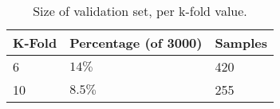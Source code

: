 \begin{table}[H]
    \centering
    \begin{tabularx}{\textwidth}{@{}lll@{}}
    \toprule
    K-Fold & Percentage (of 3000) & Samples \\ \midrule
    6      & \(14\%\)             & 420     \\
    10     & \(8.5\%\)            & 255     \\ \bottomrule
    \end{tabularx}
    \caption{Size of validation set, per k-fold value.}\label{tab:k-fold-table}
\end{table}
